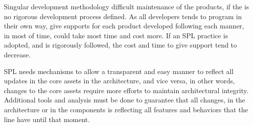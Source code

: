 Singular development methodology difficult maintenance of the products, if the is no rigorous development process defined. As all developers tends to program in their own way, give supports for each product developed following each manner, in most of time, could take most time and cost more. If an SPL practice is adopted, and is rigorously followed, the cost and time to give support tend to decrease.

SPL needs mechanisms to allow a transparent and easy manner to reflect all updates in the core assets in the architecture, and vice versa, in other words, changes to the core assets require more efforts to maintain architectural integrity. Additional tools and analysis must be done to guarantee that all changes, in the architecture or in the components is reflecting all features and behaviors that the line have until that moment.